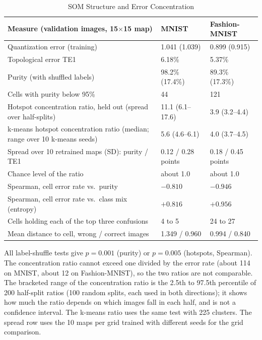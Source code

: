 \documentclass{scrartcl}
\begin{document}
\begin{table}[H]
\centering
\caption{SOM Structure and Error Concentration}
\label{tab:som}
\renewcommand{\arraystretch}{1.12}
\small
\begin{tabular}{|L{0.50\textwidth}|C{0.18\textwidth}|C{0.18\textwidth}|}
\hline
\textbf{Measure (validation images, 15$\times$15 map)} & \textbf{MNIST} & \textbf{Fashion-MNIST} \\ \hline
Quantization error (training) & 1.041 (1.039) & 0.899 (0.915) \\ \hline
Topological error TE1 & 6.18\% & 5.37\% \\ \hline
Purity (with shuffled labels) & 98.2\% (17.4\%) & 89.3\% (17.3\%) \\ \hline
Cells with purity below 95\% & 44 & 121 \\ \hline
Hotspot concentration ratio, held out (spread over half-splits) & 11.1 (6.1--17.6) & 3.9 (3.2--4.4) \\ \hline
k-means hotspot concentration ratio (median; range over 10 k-means seeds) & 5.6 (4.6--6.1) & 4.0 (3.7--4.5) \\ \hline
Spread over 10 retrained maps (SD): purity / TE1 & 0.12 / 0.28 points & 0.18 / 0.45 points \\ \hline
Chance level of the ratio & about 1.0 & about 1.0 \\ \hline
Spearman, cell error rate vs.\ purity & $-0.810$ & $-0.946$ \\ \hline
Spearman, cell error rate vs.\ class mix (entropy) & $+0.816$ & $+0.956$ \\ \hline
Cells holding each of the top three confusions & 4 to 5 & 24 to 27 \\ \hline
Mean distance to cell, wrong / correct images & 1.349 / 0.960 & 0.994 / 0.840 \\ \hline
\end{tabular}

\par\vspace{3pt}
{\footnotesize\raggedright\noindent All label-shuffle tests give $p=0.001$ (purity) or $p=0.005$ (hotspots, Spearman). The concentration ratio cannot exceed one divided by the error rate (about 114 on MNIST, about 12 on Fashion-MNIST), so the two ratios are not comparable. The bracketed range of the concentration ratio is the 2.5th to 97.5th percentile of 200 half-split ratios (100 random splits, each used in both directions); it shows how much the ratio depends on which images fall in each half, and is not a confidence interval. The k-means ratio uses the same test with 225 clusters. The spread row uses the 10 maps per grid trained with different seeds for the grid comparison.\par}
\end{table}
\end{document}
